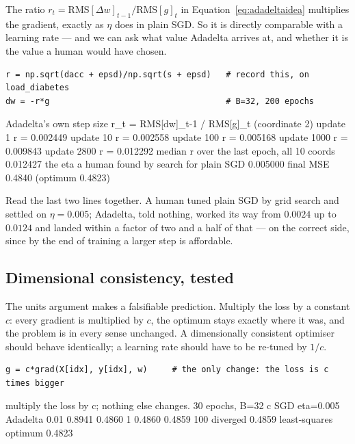 \documentclass[11pt]{article}
\begin{document}
The ratio $r_t = \mathrm{RMS}[\Delta w]_{t-1}/\mathrm{RMS}[g]_t$ in
Equation~\eqref{eq:adadeltaidea} multiplies the gradient, exactly as $\eta$ does
in plain SGD. So it is directly comparable with a learning rate --- and we can
ask what value Adadelta arrives at, and whether it is the value a human would
have chosen.

\begin{lstlisting}
r = np.sqrt(dacc + epsd)/np.sqrt(s + epsd)   # record this, on load_diabetes
dw = -r*g                                    # B=32, 200 epochs
\end{lstlisting}
\begin{codeout}
Adadelta's own step size  r_t = RMS[dw]_{t-1} / RMS[g]_t  (coordinate 2)
   update     1    r = 0.002449
   update    10    r = 0.002558
   update   100    r = 0.005168
   update  1000    r = 0.009843
   update  2800    r = 0.012292
   median r over the last epoch, all 10 coords    0.012427
   the eta a human found by search for plain SGD  0.005000
   final MSE 0.4840   (optimum 0.4823)
\end{codeout}

Read the last two lines together. A human tuned plain SGD by grid search and
settled on $\eta = 0.005$; Adadelta, told nothing, worked its way from $0.0024$
up to $0.0124$ and landed within a factor of two and a half of that --- on the
correct side, since by the end of training a larger step is affordable.

\subsection{Dimensional consistency, tested}

The units argument makes a falsifiable prediction. Multiply the loss by a
constant $c$: every gradient is multiplied by $c$, the optimum stays exactly
where it was, and the problem is in every sense unchanged. A dimensionally
consistent optimiser should behave identically; a learning rate should have to
be re-tuned by $1/c$.

\begin{lstlisting}
g = c*grad(X[idx], y[idx], w)     # the only change: the loss is c times bigger
\end{lstlisting}
\begin{codeout}
multiply the loss by c; nothing else changes.  30 epochs, B=32
c           SGD eta=0.005       Adadelta
0.01               0.8941         0.4860
1                  0.4860         0.4859
100              diverged         0.4859
least-squares optimum                     0.4823
\end{codeout}
\end{document}
